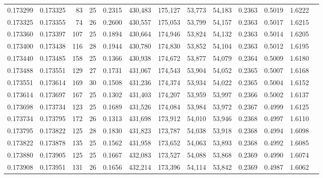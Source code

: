 \begin{tabular}{rrrrrrrrrrrrr}
0.173299 & 0.173325 &  83 &  25 &                                     0.2315 & 430,483 & 175,127 &  53,773 &  54,183 & 0.2363 & 0.5019 & 1.6222 \\
0.173325 & 0.173355 &  74 &  26 &                                     0.2600 & 430,557 & 175,053 &  53,799 &  54,157 & 0.2363 & 0.5017 & 1.6215 \\
0.173360 & 0.173397 & 107 &  25 &                                     0.1894 & 430,664 & 174,946 &  53,824 &  54,132 & 0.2363 & 0.5014 & 1.6205 \\
0.173400 & 0.173438 & 116 &  28 &                                     0.1944 & 430,780 & 174,830 &  53,852 &  54,104 & 0.2363 & 0.5012 & 1.6195 \\
0.173440 & 0.173485 & 158 &  25 &                                     0.1366 & 430,938 & 174,672 &  53,877 &  54,079 & 0.2364 & 0.5009 & 1.6180 \\
0.173488 & 0.173551 & 129 &  27 &                                     0.1731 & 431,067 & 174,543 &  53,904 &  54,052 & 0.2365 & 0.5007 & 1.6168 \\
0.173551 & 0.173614 & 169 &  30 &                                     0.1508 & 431,236 & 174,374 &  53,934 &  54,022 & 0.2365 & 0.5004 & 1.6152 \\
0.173614 & 0.173697 & 167 &  25 &                                     0.1302 & 431,403 & 174,207 &  53,959 &  53,997 & 0.2366 & 0.5002 & 1.6137 \\
0.173698 & 0.173734 & 123 &  25 &                                     0.1689 & 431,526 & 174,084 &  53,984 &  53,972 & 0.2367 & 0.4999 & 1.6125 \\
0.173734 & 0.173795 & 172 &  26 &                                     0.1313 & 431,698 & 173,912 &  54,010 &  53,946 & 0.2368 & 0.4997 & 1.6110 \\
0.173795 & 0.173822 & 125 &  28 &                                     0.1830 & 431,823 & 173,787 &  54,038 &  53,918 & 0.2368 & 0.4994 & 1.6098 \\
0.173822 & 0.173878 & 135 &  25 &                                     0.1562 & 431,958 & 173,652 &  54,063 &  53,893 & 0.2368 & 0.4992 & 1.6085 \\
0.173880 & 0.173905 & 125 &  25 &                                     0.1667 & 432,083 & 173,527 &  54,088 &  53,868 & 0.2369 & 0.4990 & 1.6074 \\
0.173908 & 0.173951 & 131 &  26 &                                     0.1656 & 432,214 & 173,396 &  54,114 &  53,842 & 0.2369 & 0.4987 & 1.6062 \\

\end{tabular}
